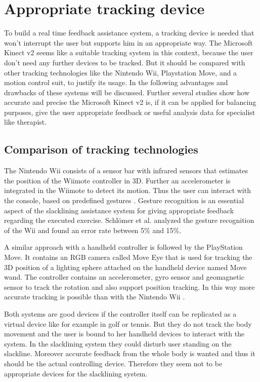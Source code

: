 \section{Appropriate tracking device}

To build a real time feedback assistance system, a tracking device is needed that won’t interrupt the user but supports him in an appropriate way. The Microsoft Kinect v2 seems like a suitable tracking system in this context, because the user don’t need any further devices to be tracked. But it should be compared with other tracking technologies like the Nintendo Wii, Playstation Move, and a motion control suit, to justify its usage. In the following advantages and drawbacks of these systems will be discussed. Further several studies show how accurate and precise the Microsoft Kinect v2 is, if it can be applied for balancing purposes, give the user appropriate feedback or useful analysis data for specialist like therapist.

\subsection{Comparison of tracking technologies}

The Nintendo Wii consists of a sensor bar with infrared sensors that estimates the position of the Wiimote controller in 3D. Further an accelerometer is integrated in the Wiimote to detect its motion. Thus the user can interact with the console, based on predefined gestures \cite{Bogdanovych2015-ci} \cite{Tanaka2012-ACO}. Gesture recognition is an essential aspect of the slacklining assistance system for giving appropriate feedback regarding the executed exercise. Schlömer et al. \cite{Schlomer2008-uo} analyzed the gesture recognition of the Wii and found an error rate between 5\% and 15\%.

A similar approach with a handheld controller is followed by the PlayStation Move. It contains an RGB camera called Move Eye that is used for tracking the 3D position of a lighting sphere attached on the handheld device named Move wand. The controller contains an accelerometer, gyro sensor and geomagnetic sensor to track the rotation and also support position tracking. In this way more accurate tracking is possible than with the Nintendo Wii \cite{Bogdanovych2015-ci} \cite{Tanaka2012-ACO}.

Both systems are good devices if the controller itself can be replicated as a virtual device like for example in golf or tennis. But they do not track the body movement and the user is bound to her handheld devices to interact with the system. In the slacklining system they could disturb user standing on the slackline. Moreover accurate feedback from the whole body is wanted and thus it should be the actual controlling device. Therefore they seem not to be appropriate devices for the slacklining system.

